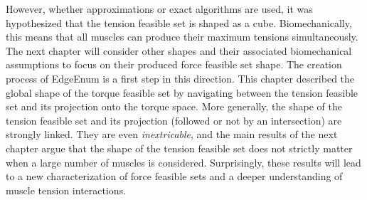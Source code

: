 However, whether approximations or exact algorithms are used, it was hypothesized that the tension feasible set is shaped as a cube. Biomechanically, this means that all muscles can produce their maximum tensions simultaneously. The next chapter will consider other shapes and their associated biomechanical assumptions to focus on their produced force feasible set shape. The creation process of EdgeEnum is a first step in this direction. This chapter described the global shape of the torque feasible set by navigating between the tension feasible set and its projection onto the torque space. More generally, the shape of the tension feasible set and its projection (followed or not by an intersection) are strongly linked. They are even \emph{inextricable}, and the main results of the next chapter argue that the shape of the tension feasible set does not strictly matter when a large number of muscles is considered. Surprisingly, these results will lead to a new characterization of force feasible sets and a deeper understanding of muscle tension interactions.
